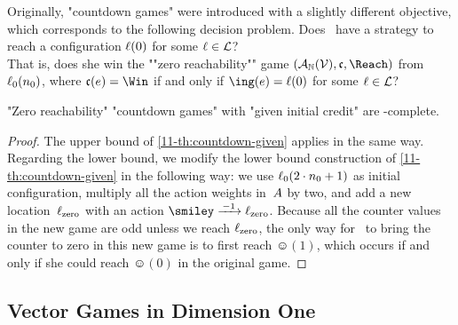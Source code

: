 \medskip
Originally, "countdown games" were introduced with a slightly
different objective, which corresponds to the following decision
problem.
\AP{}
  {Does \Eve\ have a strategy to reach a configuration $\ell(0)$ for
  some $\ell\in\mathcal L$?\\That is, does she win the ""zero
  reachability""
  game $(\?A_\+N(\?V),\col,\Reach)$ from $\ell_0(n_0)$, where
  $\col(e)=\Win$ if and only if $\ing(e)=\loc(0)$ for some $\ell\in\mathcal L$?}
\begin{theorem}
\label{11-th:countdown-zero}
  "Zero reachability" "countdown games" with "given initial credit"
  are \EXP-complete.
\end{theorem}
\begin{proof}
  The upper bound of \cref{11-th:countdown-given} applies in the same
  way.  Regarding the lower bound, we modify the lower bound
  construction of \cref{11-th:countdown-given} in the following way: we
  use $\ell_0(2\cdot n_0+1)$ as initial configuration, multiply all
  the action weights in~$A$ by two, and add a new
  location~$\ell_\mathrm{zero}$ with an action
  $\smiley\step{-1}\loc_\mathrm{zero}$.  Because all the counter
  values in the new game are odd unless we reach $\ell_\mathrm{zero}$,
  the only way for \Eve\ to bring the counter to zero in this new game
  is to first reach $\smiley(1)$, which occurs if and only if she
  could reach $\smiley(0)$ in the original game.
\end{proof}

\subsection{Vector Games in Dimension One}
\label{11-sec:one-counter}

